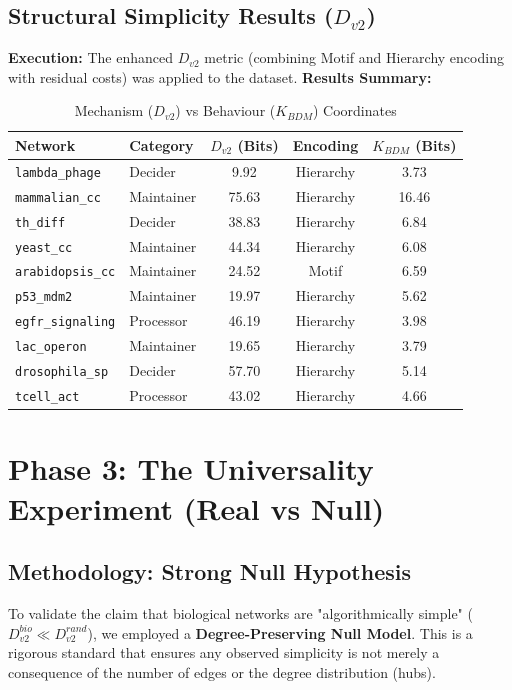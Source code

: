 \documentclass{article}
\begin{document}
\subsection{Structural Simplicity Results ($D_{v2}$)}
\textbf{Execution:} The enhanced $D_{v2}$ metric (combining Motif and Hierarchy encoding with residual costs) was applied to the dataset.
\textbf{Results Summary:}
\begin{table}[H]
\centering
\caption{Mechanism ($D_{v2}$) vs Behaviour ($K_{BDM}$) Coordinates}
\label{tab:results_real}
\begin{tabular}{@{}l l c c c@{}}
\toprule
\textbf{Network} & \textbf{Category} & \textbf{$D_{v2}$ (Bits)} & \textbf{Encoding} & \textbf{$K_{BDM}$ (Bits)} \\ \midrule
\texttt{lambda\_phage} & Decider & 9.92 & Hierarchy & 3.73 \\
\texttt{mammalian\_cc} & Maintainer & 75.63 & Hierarchy & 16.46 \\
\texttt{th\_diff} & Decider & 38.83 & Hierarchy & 6.84 \\
\texttt{yeast\_cc} & Maintainer & 44.34 & Hierarchy & 6.08 \\
\texttt{arabidopsis\_cc} & Maintainer & 24.52 & Motif & 6.59 \\
\texttt{p53\_mdm2} & Maintainer & 19.97 & Hierarchy & 5.62 \\
\texttt{egfr\_signaling} & Processor & 46.19 & Hierarchy & 3.98 \\
\texttt{lac\_operon} & Maintainer & 19.65 & Hierarchy & 3.79 \\
\texttt{drosophila\_sp} & Decider & 57.70 & Hierarchy & 5.14 \\
\texttt{tcell\_act} & Processor & 43.02 & Hierarchy & 4.66 \\ \bottomrule
\end{tabular}
\end{table}

\section{Phase 3: The Universality Experiment (Real vs Null)}

\subsection{Methodology: Strong Null Hypothesis}
To validate the claim that biological networks are "algorithmically simple" ($D_{v2}^{bio} \ll D_{v2}^{rand}$), we employed a \textbf{Degree-Preserving Null Model}. This is a rigorous standard that ensures any observed simplicity is not merely a consequence of the number of edges or the degree distribution (hubs).
\end{document}
